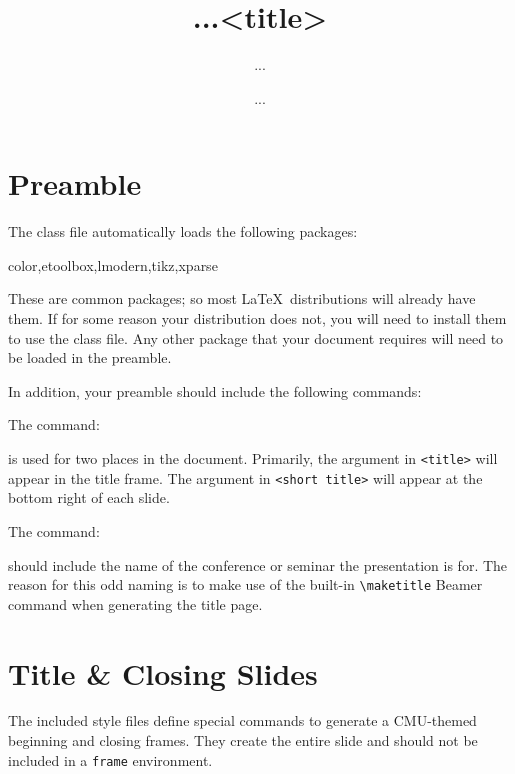 \documentclass[11pt]{article}
\begin{document}
\section{Preamble}

The class file automatically loads the following packages:
\begin{tex}
color,etoolbox,lmodern,tikz,xparse
\end{tex}
These are common packages; so most \LaTeX\ distributions will already have them.  If for some reason your distribution does not, you will need to install them to use the class file.  Any other package that your document requires will need to be loaded in the preamble.

In addition, your preamble should include the following commands:
\begin{tex}
\title[...]{...}  %
\author{...}      %
\date{...}        %
\end{tex}

The command:
\begin{tex}
\title[<short title>]{<title>}
\end{tex}
is used for two places in the document.  Primarily, the argument in \lstinline[basicstyle=\ttfamily]!<title>! will appear in the title frame.  The argument in \lstinline[basicstyle=\ttfamily]!<short title>! will appear at the bottom right of each slide.

The command:
\begin{tex}
\end{tex}
should include the name of the conference or seminar the presentation is for.  The reason for this odd naming is to make use of the built-in \lstinline[basicstyle=\ttfamily]!\maketitle! Beamer command when generating the title page.

\section{Title \& Closing Slides}

The included style files define special commands to generate a CMU-themed beginning and closing frames.  They create the entire slide and should not be included in a \lstinline[basicstyle=\ttfamily]!frame! environment.
\end{document}
